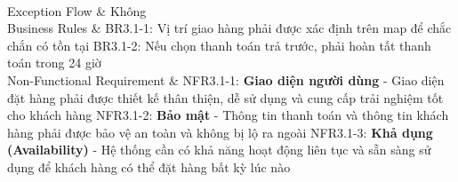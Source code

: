 \begin{usecase_table}
                    \\
                    \hline
                    Exception Flow & Không\\
                    \hline
                    Business Rules	& BR3.1-1: Vị trí giao hàng phải được xác định trên map để chắc chắn có tồn tại\newline
                    BR3.1-2: Nếu chọn thanh toán trả trước, phải hoàn tất thanh toán trong 24 giờ\\
                    \hline
                    Non-Functional Requirement & 
                    NFR3.1-1: \textbf{Giao diện người dùng} - Giao diện đặt hàng phải được thiết kế thân thiện, dễ sử dụng và cung cấp trải nghiệm tốt cho khách hàng\newline
                    NFR3.1-2: \textbf{Bảo mật} - Thông tin thanh toán và thông tin khách hàng phải được bảo vệ an toàn và không bị lộ ra ngoài \newline
                    NFR3.1-3: \textbf{Khả dụng (Availability)} - Hệ thống cần có khả năng hoạt động liên tục và sẵn sàng sử dụng để khách hàng có thể đặt hàng bất kỳ lúc nào
                    \\
                    \hline
                \end{usecase_table}
            \newpage    

            \newpage    
